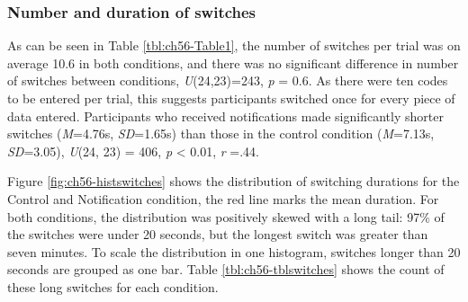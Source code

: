 \subsubsection{Number and duration of switches}
As can be seen in Table \ref{tbl:ch56-Table1}, the number of switches per trial was on average 10.6 in both conditions, and there was no significant difference in number of switches between conditions, \textit{U}(24,23)=243, \textit{p} = 0.6. As there were ten codes to be entered per trial, this suggests participants switched once for every piece of data entered. Participants who received notifications made significantly shorter switches (\textit{M}=4.76s, \textit{SD}=1.65s) than those in the control condition (\textit{M}=7.13s, \textit{SD}=3.05), \textit{U}(24, 23) = 406, \textit{p} < 0.01, \textit{r} =.44. 

Figure \ref{fig:ch56-histswitches} shows the distribution of switching durations for the Control and Notification condition, the red line marks the mean duration. For both conditions, the distribution was positively skewed with a long tail: 97\% of the switches were under 20 seconds, but the longest switch was greater than seven minutes. To scale the distribution in one histogram, switches longer than 20 seconds are grouped as one bar. Table \ref{tbl:ch56-tblswitches} shows the count of these long switches for each condition.

